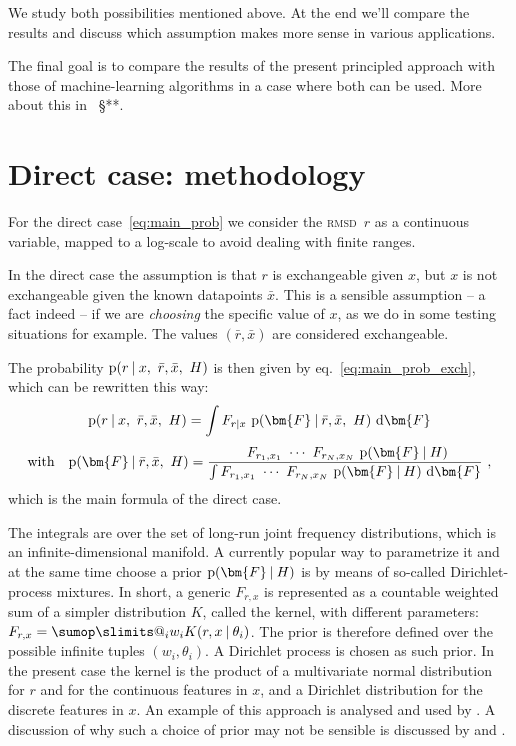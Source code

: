 \documentclass[\ifafour a4paper,12pt,\else a5paper,10pt,\fi%
onecolumn,oneside,article,%
british%
]{memoir}
\makeatletter
\theoremstyle{remark}
\theoremstyle{innote}
\def\sum{\DOTSI\sumop\slimits@}
\newcommand*{\di}{\mathrm{d}}%
\newcommand*{\p}{\mathrm{p}}%
\renewcommand*{\|}[1][]{\nonscript\:#1\vert\nonscript\:\mathopen{}}
\renewcommand*{\=}{\TextOrMath\texteq\eq}
\newcommand*{\sect}{\S}%
\newcommand*{\eqn}{eq.}%
\newcommand*{\wrench}{{\fontencoding{U}\fontfamily{fontawesomethree}\selectfont\symbol{114}}}
\newcommand{\mynote}[1]{ {\color{notecolour}#1}}
\newcommand*{\rmsd}{\textsc{rmsd}}
\newcommand*{\ro}{r}
\newcommand*{\xo}{x}
\newcommand*{\rd}{\bar{r}}
\newcommand*{\xd}{\bar{x}}
\newcommand*{\yF}{\bm{F}}
\makeatother
\begin{document}
We study both possibilities mentioned above. At the end we'll compare the
results and discuss which assumption makes more sense in various
applications.

The final goal is to compare the results of the present principled approach
with those of machine-learning algorithms in a case where both can be used.
More about this in \mynote{\wrench\ \sect***}.


\section{Direct case: methodology}
\label{sec:direct_method}

For the direct case~\eqref{eq:main_prob} we consider the \rmsd\ $r$ as a
continuous variable, mapped to a log-scale to avoid dealing with finite
ranges.

In the direct case the assumption is that $\ro$ is exchangeable given
$\xo$, but $\xo$ is not exchangeable given the known datapoints $\xd$.
This is a sensible assumption -- a fact indeed -- if we are \emph{choosing}
the specific value of $\xo$, as we do in some testing situations for
example. The values $(\rd,\xd)$ are considered exchangeable.

The probability $\p(\ro \| \xo,\ \rd,\xd,\ H)$ is then given by
\eqn~\eqref{eq:main_prob_exch}, which can be rewritten this way:
\begin{equation}
  \label{eq:direct_case_main}
  \begin{gathered}
  \p(\ro \| \xo,\ \rd,\xd,\ H) =
  \int F_{\ro\|\xo} \ \p(\yF \| \rd, \xd,\ H)\ \di\yF
  \\[\jot]
  \text{with}\quad
  \p(\yF \| \rd, \xd,\ H) =
  \frac{
    \ F_{r_{1},x_{1}} \  \dotsm \
  F_{r_{N},x_{N}} \ \p(\yF \| H)
  }{
    \int F_{r_{1},x_{1}} \  \dotsm \
  F_{r_{N},x_{N}} \ \p(\yF \| H)\ \di\yF
  }  \ ,
\end{gathered}
\end{equation}
which is the main formula of the direct case.

The integrals are over the set of long-run joint frequency distributions,
which is an infinite-dimensional manifold. A currently popular way to
parametrize it and at the same time choose a prior $\p(\yF \| H)$ is by
means of so-called Dirichlet-process mixtures. In short, a generic
$F_{r,x}$ is represented as a countable weighted sum of a simpler
distribution $K$, called the kernel, with different parameters:
$F_{r,x} = \sum_{i}w_{i} K(r,x \| \theta_{i})$. The prior is therefore
defined over the possible infinite tuples $(w_{i},\theta_{i})$. A Dirichlet
process is chosen as such prior. In the present case the kernel is the
product of a multivariate normal distribution for $r$ and for the
continuous features in $x$, and a Dirichlet distribution for the discrete
features in $x$. An example of
this approach is analysed and used by \textcites{muelleretal1996}. A
discussion of why such a choice of prior may not be sensible is discussed
by \textcite{petrone2017} and \textcite[\sect~4]{quintanaetal2020}.
\end{document}
